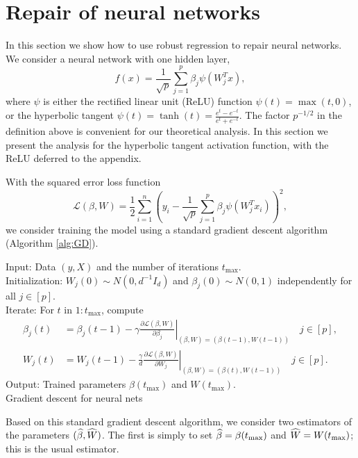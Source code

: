 

\def\L{{\mathcal L}}
\section{Repair of neural networks}
\label{sec:neural}

In this section we show how to use robust regression to repair neural networks.
We consider a neural network with one hidden layer,
$$f(x)=\frac{1}{\sqrt{p}}\sum_{j=1}^p\beta_j\psi(W_j^Tx),$$
where $\psi$ is either the rectified linear unit (ReLU) function $\psi(t)=\max(t,0)$, or the
hyperbolic tangent $\psi(t) = \tanh(t) = \frac{e^t - e^{-t}}{e^t + e^{-t}}$.
The factor $p^{-1/2}$ in the definition above is convenient for our theoretical analysis.
In this section we present the analysis for the hyperbolic tangent activation function, with the ReLU
deferred to the appendix.

With the squared error loss function
$$\L(\beta,W)=\frac{1}{2}\sum_{i=1}^n\left(y_i - \frac{1}{\sqrt{p}}\sum_{j=1}^p\beta_j\psi(W_j^Tx_i)\right)^2,$$
we consider training the model using a standard gradient descent algorithm (Algorithm \ref{alg:GD}).

\vskip10pt
\begin{algorithm}[H]
\DontPrintSemicolon
\vskip5pt
\nl Input: Data $(y, X)$ and the number of iterations $t_{\max}$. \\[3pt]
\nl Initialization: $W_j(0)\sim N(0,d^{-1}I_d)$ and $\beta_j(0)\sim N(0,1)$ independently for all $j\in[p]$. \\[3pt]
\nl Iterate: For $t$ in $1:t_{\max}$, compute
\begin{align*}
\beta_j(t) &= \beta_j(t-1) - \left.\gamma\frac{\partial \L(\beta,W)}{\partial \beta_j}\right|_{(\beta,W)=(\beta(t-1),W(t-1))} \quad j\in[p], \\
W_j(t) &= W_j(t-1) - \left.\frac{\gamma}{d}\frac{\partial \L(\beta,W)}{\partial W_j}\right|_{(\beta,W)=(\beta(t),W(t-1))} \quad j\in[p].
\end{align*}
\nl Output: Trained parameters $\beta(t_{\max})$ and $W(t_{\max})$.\\[5pt]
\caption{Gradient descent for neural nets}\label{alg:GD}
\end{algorithm}
\vskip10pt

Based on this standard gradient descent algorithm, we consider two estimators of the parameters $(\widehat{\beta},\widehat{W})$.
The first is simply to set $\widehat{\beta}=\beta(t_{\max})$ and $\widehat{W}=W(t_{\max})$; this is the usual estimator.

